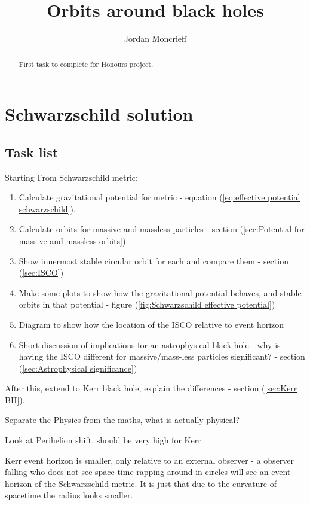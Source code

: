 \documentclass{article}
\title{Orbits around black holes}
\author{Jordan Moncrieff}
\begin{document}
\maketitle

\begin{abstract}
First task to complete for Honours project.
\end{abstract}

\section{Schwarzschild solution}

\subsection{Task list}

Starting From Schwarzschild metric:

\begin{enumerate}
  \item Calculate gravitational potential for metric - equation (\ref{eq:effective potential schwarzschild}).
  \item Calculate orbits for massive and massless particles - section (\ref{sec:Potential for massive and massless orbits}).
  \item Show innermost stable circular orbit for each and compare them - section (\ref{sec:ISCO})
  \item Make some plots to show how the gravitational potential behaves, and stable orbits in that potential - figure (\ref{fig:Schwarzschild effective potential})
  \item Diagram to show how the location of the ISCO relative to event horizon
  \item Short discussion of implications for an astrophysical black hole - why is having the ISCO different for massive/mass-less particles significant? - section (\ref{sec:Astrophysical significance})
\end{enumerate}

After this, extend to Kerr black hole, explain the differences - section (\ref{sec:Kerr BH}).

Separate the Physics from the maths, what is actually physical?

Look at Perihelion shift, should be very high for Kerr. 

Kerr event horizon is smaller, only relative to an external observer - a observer falling who does not see space-time rapping around in circles will see an event horizon of the Schwarzschild metric. It is just that due to the curvature of spacetime the radius looks smaller.
\end{document}
